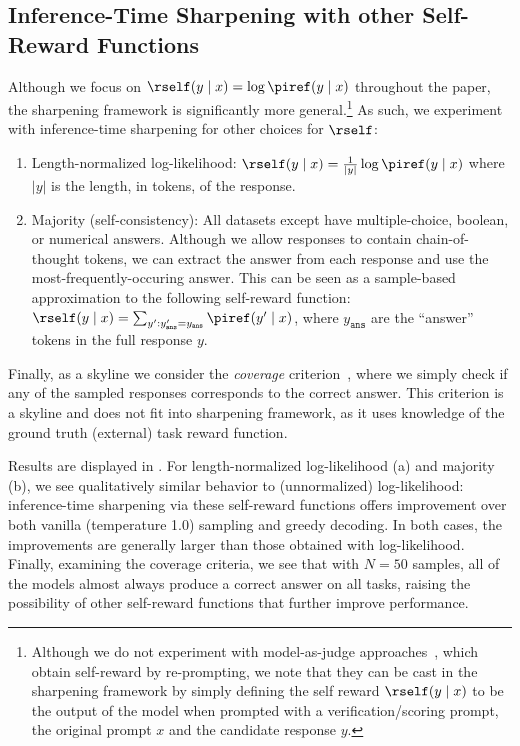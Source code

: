 \subsection{Inference-Time Sharpening with other Self-Reward Functions}
Although we focus on $\rself(y \mid{}x) = \log\piref(y \mid{}x)$ throughout the paper, the sharpening framework is significantly more general.\footnote{Although we do not experiment with model-as-judge approaches~\citep[e.g.,][]{huang2022large}, which obtain self-reward by re-prompting, we note that they can be cast in the sharpening framework by simply defining the self reward $\rself(y \mid{} x)$ to be the output of the model when prompted with a verification/scoring prompt, the original prompt $x$ and the candidate response $y$.} As such, we experiment with inference-time sharpening for other choices for $\rself$:\loose
\begin{enumerate}
  \item Length-normalized log-likelihood: $\rself(y \mid{}x) = \frac{1}{|y|} \log\piref(y \mid{}x)$ where $|y|$ is the length, in tokens, of the response.
  \item Majority (self-consistency): All datasets except \gametwentyfour have multiple-choice, boolean, or numerical answers. Although we allow responses to contain chain-of-thought tokens, we can extract the answer from each response and use the most-frequently-occuring answer. This can be seen as a sample-based approximation to the following self-reward function: $\rself(y\mid{}x) = \sum_{y': y'_{\texttt{ans}}=y_{\texttt{ans}}} \piref(y'\mid{}x)$, where $y_{\texttt{ans}}$ are the ``answer'' tokens in the full response $y$. 
\end{enumerate}
Finally, as a skyline we consider the \emph{coverage} criterion~\citep{brown2024large}, where we simply check if any of the sampled responses corresponds to the correct answer. This criterion is a skyline and does not fit into sharpening framework, as it uses knowledge of the ground truth (external) task reward function. 

Results are displayed in . For length-normalized log-likelihood (a) and majority (b), we see qualitatively similar behavior to (unnormalized) log-likelihood: inference-time sharpening via these self-reward functions offers improvement over both vanilla (temperature 1.0) sampling and greedy decoding. In both cases, the improvements are generally larger than those obtained with log-likelihood. Finally, examining the coverage criteria, we see that with $N=50$ samples, all of the models almost always produce a correct answer on all tasks, raising the possibility of other self-reward functions that further improve performance.


